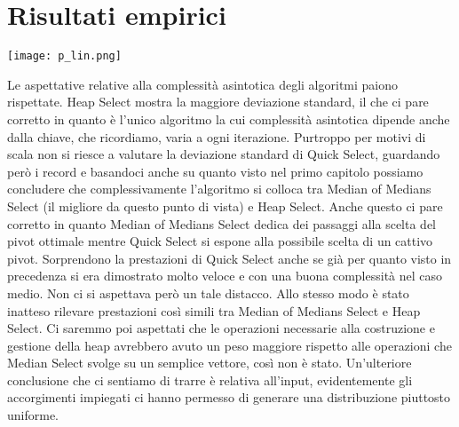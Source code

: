 \documentclass{article}
\begin{document}
\section{Risultati empirici}
\begin{center}
\texttt{[image: p\_lin.png]}
\end{center}
Le aspettative relative alla complessità asintotica degli algoritmi paiono rispettate.
\newline
\newline
Heap Select mostra la maggiore deviazione standard, il che ci pare corretto in quanto è l'unico algoritmo la cui complessità asintotica dipende anche dalla chiave, che ricordiamo, varia a ogni iterazione.
\newline
\newline
Purtroppo per motivi di scala non si riesce a valutare la deviazione standard di Quick Select, guardando però i record e basandoci anche su quanto visto nel primo capitolo possiamo concludere che complessivamente l'algoritmo si colloca tra Median of Medians Select (il migliore da questo punto di vista) e Heap Select.
\newline
Anche questo ci pare corretto in quanto Median of Medians Select dedica dei passaggi alla scelta del pivot ottimale mentre Quick Select si espone alla possibile scelta di un cattivo pivot.
\newline
\newline
Sorprendono la prestazioni di Quick Select anche se già per quanto visto in precedenza si era dimostrato molto veloce e con una buona complessità nel caso medio. Non ci si aspettava però un tale distacco.
\newline
\newline
Allo stesso modo è stato inatteso rilevare prestazioni così simili tra Median of Medians Select e Heap Select. Ci saremmo poi aspettati che le operazioni necessarie alla costruzione e gestione della heap avrebbero avuto un peso maggiore rispetto alle operazioni che Median Select svolge su un semplice vettore, così non è stato.
\newline
\newline
Un'ulteriore conclusione che ci sentiamo di trarre è relativa all'input, evidentemente gli accorgimenti impiegati ci hanno permesso di generare una distribuzione piuttosto uniforme.
\end{document}
